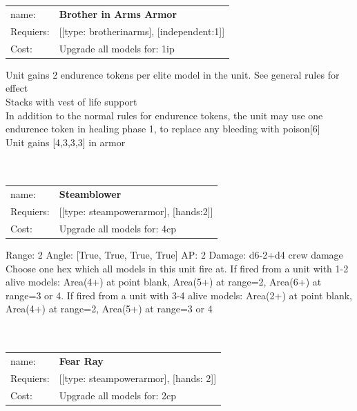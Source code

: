 \ \\
\ \\
\begin{tabular}{ll}
name: & {\bf Brother in Arms Armor } \\
Requiers: & [[type: brotherinarms], [independent:1]] \\
Cost: & Upgrade all models for: 1ip \\
\end{tabular}

Unit gains 2 endurence tokens per elite model in the unit. See general rules for effect\\ 
Stacks with vest of life support\\ 
In addition to the normal rules for endurence tokens, the unit may use one endurence token in healing phase 1, to replace any bleeding with poison[6]\\ 
Unit gains [4,3,3,3] in armor\\ 









\ \\
\ \\
\begin{tabular}{ll}
name: & {\bf Steamblower } \\
Requiers: & [[type: steampowerarmor], [hands:2]] \\
Cost: & Upgrade all models for: 4cp \\
\end{tabular}



Range: 2  Angle: [True, True, True, True] AP: 2 Damage: d6-2+d4 crew damage \\
Choose one hex which all models in this unit fire at. If fired from a unit with 1-2 alive models: Area(4+) at point blank, Area(5+) at range=2, Area(6+) at range=3 or 4. If fired from a unit with 3-4 alive models: Area(2+) at point blank, Area(4+) at range=2, Area(5+) at range=3 or 4\\ 








\ \\
\ \\
\begin{tabular}{ll}
name: & {\bf Fear Ray } \\
Requiers: & [[type: steampowerarmor], [hands: 2]] \\
Cost: & Upgrade all models for: 2cp \\
\end{tabular}




